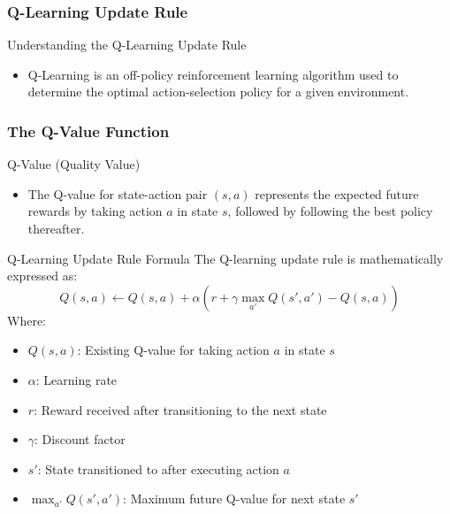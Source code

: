 \documentclass[aspectratio=169]{beamer}
\begin{document}
\begin{frame}[fragile]
    \frametitle{Q-Learning Update Rule}
    \begin{block}{Understanding the Q-Learning Update Rule}
        \begin{itemize}
            \item Q-Learning is an off-policy reinforcement learning algorithm used to determine the optimal action-selection policy for a given environment.
        \end{itemize}
    \end{block}
\end{frame}

\begin{frame}[fragile]
    \frametitle{The Q-Value Function}
    \begin{block}{Q-Value (Quality Value)}
        \begin{itemize}
            \item The Q-value for state-action pair \( (s, a) \) represents the expected future rewards by taking action \( a \) in state \( s \), followed by following the best policy thereafter.
        \end{itemize}
    \end{block}
    
    \begin{block}{Q-Learning Update Rule Formula}
        The Q-learning update rule is mathematically expressed as:
        \begin{equation}
            Q(s, a) \leftarrow Q(s, a) + \alpha \left( r + \gamma \max_{a'} Q(s', a') - Q(s, a) \right) 
        \end{equation}
        Where:
        \begin{itemize}
            \item \( Q(s, a) \): Existing Q-value for taking action \( a \) in state \( s \)
            \item \( \alpha \): Learning rate
            \item \( r \): Reward received after transitioning to the next state
            \item \( \gamma \): Discount factor
            \item \( s' \): State transitioned to after executing action \( a \)
            \item \( \max_{a'} Q(s', a') \): Maximum future Q-value for next state \( s' \)
        \end{itemize}
    \end{block}
\end{frame}
\end{document}
